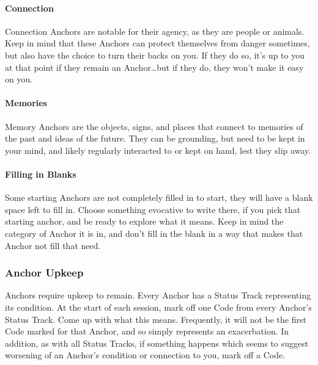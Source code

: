 \documentclass[
]{article}
\begin{document}
\hypertarget{connection}{%
\paragraph{Connection}\label{connection}}

Connection Anchors are notable for their agency, as they are people or
animals. Keep in mind that these Anchors can protect themselves from
danger sometimes, but also have the choice to turn their backs on you.
If they do so, it's up to you at that point if they remain an
Anchor\ldots but if they do, they won't make it easy on you.

\hypertarget{memories}{%
\paragraph{Memories}\label{memories}}

Memory Anchors are the objects, signs, and places that connect to
memories of the past and ideas of the future. They can be grounding, but
need to be kept in your mind, and likely regularly interacted to or kept
on hand, lest they slip away.

\hypertarget{filling-in-blanks}{%
\paragraph{Filling in Blanks}\label{filling-in-blanks}}

Some starting Anchors are not completely filled in to start, they will
have a blank space left to fill in. Choose something evocative to write
there, if you pick that starting anchor, and be ready to explore what it
means. Keep in mind the category of Anchor it is in, and don't fill in
the blank in a way that makes that Anchor not fill that need.

\hypertarget{anchor-upkeep}{%
\subsubsection{Anchor Upkeep}\label{anchor-upkeep}}

Anchors require upkeep to remain. Every Anchor has a Status Track
representing its condition. At the start of each session, mark off one
Code from every Anchor's Status Track. Come up with what this means.
Frequently, it will not be the first Code marked for that Anchor, and so
simply represents an exacerbation. In addition, as with all Status
Tracks, if something happens which seems to suggest worsening of an
Anchor's condition or connection to you, mark off a Code.
\end{document}
